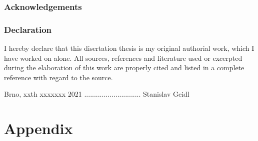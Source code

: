 \documentclass[12pt,a4paper,oneside,final]{book}
\begin{document}
\normalsize

\clearpage
\pagestyle{plain}
\vspace*{18cm}
\section*{Acknowledgements}

\clearpage
\vspace*{18cm}
\section*{Declaration}
I hereby declare that this disertation thesis is my original authorial work,
which I have worked on alone. All sources, references and literature used or
excerpted during the elaboration of this work are properly cited and listed
in a complete reference with regard to the source.

Brno, xxth xxxxxxx 2021 ............................. Stanislav Geidl


\clearpage
\tableofcontents

\clearpage
{}


\renewcommand{\thesubfigure}{\Alph{subfigure}} %
\captionsetup[figure]{labelfont=bf} 
\captionsetup[subfigure]{labelfont=bf,labelformat=simple} %
\captionsetup[table]{labelfont=bf}
\captionsetup[subtable]{labelfont=bf}







\appendix
\setcounter{tocdepth}{3}
\setcounter{secnumdepth}{-1}

\part*{Appendix}

{\footnotesize

}




\end{document}
